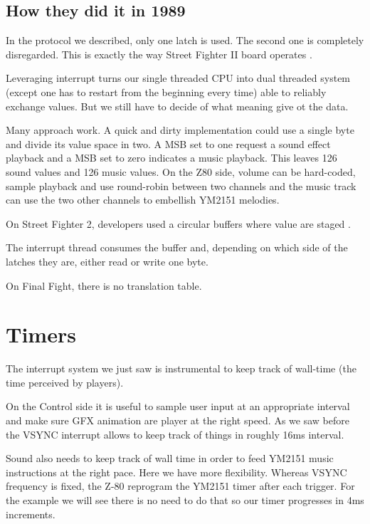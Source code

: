 \subsection{How they did it in 1989}

\begin{trivia}
In the protocol we described, only one latch is used. The second one is completely disregarded. This is exactly the way Street Fighter II board operates	.
\end{trivia}

Leveraging interrupt turns our single threaded CPU into dual threaded system (except one has to restart from the beginning every time) able to reliably exchange values. But we still have to decide of what meaning give ot the data. 


Many approach work. A quick and dirty implementation could use a single byte and divide its value space in two. A MSB set to one  request a sound effect playback and a MSB set to zero  indicates a music playback. This leaves 126 sound values and 126 music values. On the Z80 side, volume can be hard-coded, sample playback and use round-robin between two channels and the music track can use the two other channels to embellish YM2151 melodies. 

On Street Fighter 2, developers used a circular buffers where value are staged	.

The interrupt thread consumes the buffer and, depending on which side of the latches they are, either read or write one byte.



On Final Fight, there is no translation table.

\pagebreak


\section{Timers}
The interrupt system we just saw is instrumental to keep track of wall-time (the time perceived by players). 

On the Control side it is useful to sample user input at an appropriate interval and make sure GFX animation are player at the right speed. As we saw before the VSYNC interrupt allows to keep track of things in roughly 16ms interval.

Sound also needs to keep track of wall time in order to feed YM2151 music instructions at the right pace. Here we have more flexibility. Whereas VSYNC frequency is fixed,  the Z-80 reprogram the YM2151 timer after each trigger. For the example we will see there is no need to do that so our timer progresses in 4ms increments.

